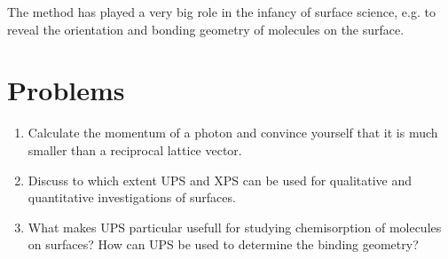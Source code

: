 The method has played a very big role in the infancy of surface science, e.g. to reveal the orientation and bonding geometry of molecules on the surface.

\section{Problems}
\begin{enumerate}
\item Calculate the momentum of a photon and convince yourself that it is much smaller than a reciprocal lattice vector.

\item Discuss to which extent UPS and XPS can be used for qualitative and quantitative investigations of surfaces.

\item What makes UPS particular usefull for studying chemisorption of molecules on surfaces? How can UPS be used to determine the binding geometry?
\end{enumerate}
